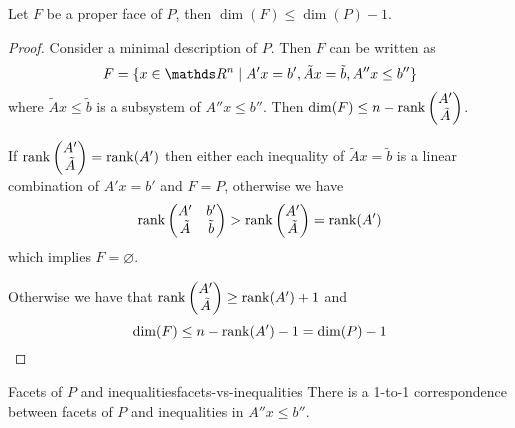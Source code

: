 \documentclass[12pt]{extarticle}
\begin{document}
\begin{corollary}{}{}
	Let $F$ be a proper face of $P$, then $\dim(F) \leq \dim(P) -1$.
\end{corollary}

\begin{proof}
	Consider a minimal description of $P$.
	Then $F$ can be written as
	\begin{equation}
		F = \{ x \in \R^n \mid A'x = b', \tilde A x = \tilde b, A'' x \leq b'' \}
	\end{equation}
	where $\tilde A x \leq \tilde b$ is a subsystem of $A '' x \leq b ''$.
	Then $\dim(F) \leq n - \rank\begin{pmatrix} A' \\ \tilde A \end{pmatrix}$.

	If $\rank\begin{pmatrix} A' \\ \tilde A \end{pmatrix} = \mathrm{rank}(A')$ then
	either each inequality of $\tilde A x = \tilde b$ is a linear combination of $A' x = b'$
	and $F = P$, otherwise we have
	\begin{equation}
		\rank \begin{pmatrix} A' & b' \\ \tilde A & \tilde b \end{pmatrix} >
		\rank \begin{pmatrix} A' \\ \tilde A \end{pmatrix} = \mathrm{rank}(A')
	\end{equation}
	which implies $F = \varnothing$.

	Otherwise we have that
	$\rank \begin{pmatrix} A' \\ \tilde A \end{pmatrix} \geq \mathrm{rank}(A') + 1$
	and
	\begin{equation}
		\dim(F) \leq n - \rank(A') - 1 = \dim(P) -1 \qedhere
	\end{equation}
\end{proof}

\begin{theorem}{Facets of $P$ and inequalities}{facets-vs-inequalities}
	There is a 1-to-1 correspondence between facets of $P$ and inequalities in $A'' x \leq b''$.
\end{theorem}
\end{document}

